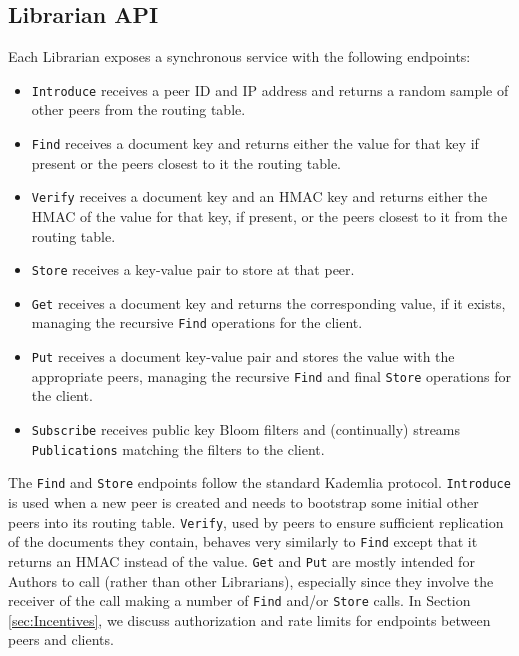 \documentclass[10pt]{article}
\newcommand{\ttt}[1]{\texttt{#1}}
\def\Put{\ttt{Put}}
\def\Get{\ttt{Get}}
\begin{document}
\subsection{Librarian API}
\label{sec:API}
Each Librarian exposes a synchronous service with the following endpoints:
\begin{itemize}
	\item \ttt{Introduce} receives a peer ID and IP address and returns a random sample of other peers from the routing table.
	\item \ttt{Find} receives a document key and returns either the value for that key if present or the peers closest to it the routing table.
	\item \ttt{Verify} receives a document key and an HMAC key and returns either the HMAC of the value for that key, if present, or the peers closest to it from the routing table.
	\item \ttt{Store} receives a key-value pair to store at that peer.
	\item \ttt{Get} receives a document key and returns the corresponding value, if it exists, managing the recursive \texttt{Find} operations for the client.
	\item \ttt{Put} receives a document key-value pair and stores the value with the appropriate peers, managing the recursive \texttt{Find} and final \ttt{Store} operations for the client.
	\item \ttt{Subscribe} receives public key Bloom filters and (continually) streams \ttt{Publications} matching the filters to the client.
\end{itemize}

The \ttt{Find} and \texttt{Store} endpoints follow the standard Kademlia protocol. \texttt{Introduce} is used when a new peer is created and needs to bootstrap some initial other peers into its routing table. \texttt{Verify}, used by peers to ensure sufficient replication of the documents they contain, behaves very similarly to \texttt{Find} except that it returns an HMAC instead of the value. \Get{} and \Put{} are mostly intended for Authors to call (rather than other Librarians), especially since they involve the receiver of the call making a number of \texttt{Find} and/or \texttt{Store} calls. In Section \ref{sec:Incentives}, we discuss authorization and rate limits for endpoints between peers and clients.
\end{document}
